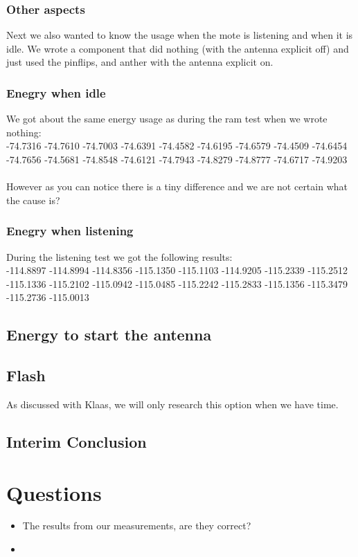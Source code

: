 \documentclass{article}
\begin{document}
\subsubsection{Other aspects}
Next we also wanted to know the usage when the mote is listening and when it is idle. We wrote  a component that did nothing (with the antenna explicit off) and just used the pinflips, and anther with the antenna explicit on.
\subsubsection{Enegry when idle}
We got about the same energy usage as during the ram test when we wrote nothing:\\
-74.7316  -74.7610  -74.7003  -74.6391  -74.4582  -74.6195  -74.6579  -74.4509  -74.6454  -74.7656  -74.5681  -74.8548  -74.6121  -74.7943  -74.8279  -74.8777  -74.6717  -74.9203\\
\\
However as you can notice there is a tiny difference and we are not certain what the cause is?
\subsubsection{Enegry when listening}
During the listening test we got the following results:\\
-114.8897 -114.8994 -114.8356 -115.1350 -115.1103 -114.9205 -115.2339 -115.2512 -115.1336 -115.2102 -115.0942 -115.0485 -115.2242 -115.2833 -115.1356 -115.3479 -115.2736 -115.0013\\
\subsection{Energy to start the antenna}
\subsection{Flash}
As discussed with Klaas, we will only research this option when we have time.

\subsection{Interim Conclusion}

\section{Questions}
\begin{itemize}
\item The results from our measurements, are they correct?
\item 
\end{itemize}
\end{document}

